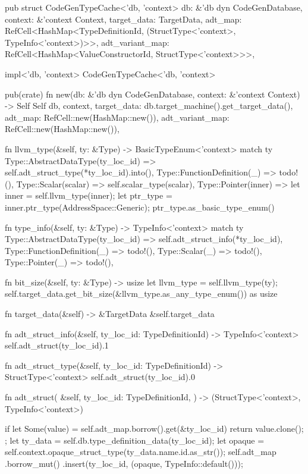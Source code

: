 \documentclass[
  oneside,
  english,
  coorientadorbanca,
  noabntexcite
]{ufsc-thesis-rn46-2019}
\begin{document}
\begin{rustcode}
pub struct CodeGenTypeCache<'db, 'context> {
    db: &'db dyn CodeGenDatabase,
    context: &'context Context,
    target_data: TargetData,
    adt_map: RefCell<HashMap<TypeDefinitionId, (StructType<'context>, TypeInfo<'context>)>>,
    adt_variant_map: RefCell<HashMap<ValueConstructorId, StructType<'context>>>,
}

impl<'db, 'context> CodeGenTypeCache<'db, 'context> {
    pub(crate) fn new(db: &'db dyn CodeGenDatabase, context: &'context Context) -> Self {
        Self {
            db,
            context,
            target_data: db.target_machine().get_target_data(),
            adt_map: RefCell::new(HashMap::new()),
            adt_variant_map: RefCell::new(HashMap::new()),
        }
    }

    fn llvm_type(&self, ty: &Type) -> BasicTypeEnum<'context> {
        match ty {
            Type::AbstractDataType(ty_loc_id) => self.adt_struct_type(*ty_loc_id).into(),
            Type::FunctionDefinition(_) => todo!(),
            Type::Scalar(scalar) => self.scalar_type(scalar),
            Type::Pointer(inner) => {
                let inner = self.llvm_type(inner);
                let ptr_type = inner.ptr_type(AddressSpace::Generic);
                ptr_type.as_basic_type_enum()
            }
        }
    }

    fn type_info(&self, ty: &Type) -> TypeInfo<'context> {
        match ty {
            Type::AbstractDataType(ty_loc_id) => self.adt_struct_info(*ty_loc_id),
            Type::FunctionDefinition(_) => todo!(),
            Type::Scalar(_) => todo!(),
            Type::Pointer(_) => todo!(),
        }
    }

    fn bit_size(&self, ty: &Type) -> usize {
        let llvm_type = self.llvm_type(ty);
        self.target_data.get_bit_size(&llvm_type.as_any_type_enum()) as usize
    }

    fn target_data(&self) -> &TargetData {
        &self.target_data
    }

    fn adt_struct_info(&self, ty_loc_id: TypeDefinitionId) -> TypeInfo<'context> {
        self.adt_struct(ty_loc_id).1
    }

    fn adt_struct_type(&self, ty_loc_id: TypeDefinitionId) -> StructType<'context> {
        self.adt_struct(ty_loc_id).0
    }

    fn adt_struct(
        &self,
        ty_loc_id: TypeDefinitionId,
    ) -> (StructType<'context>, TypeInfo<'context>) {
        if let Some(value) = self.adt_map.borrow().get(&ty_loc_id) {
            return value.clone();
        };
        let ty_data = self.db.type_definition_data(ty_loc_id);
        let opaque = self.context.opaque_struct_type(ty_data.name.id.as_str());
        self.adt_map
            .borrow_mut()
            .insert(ty_loc_id, (opaque, TypeInfo::default()));

}}
\end{rustcode}
\end{document}
